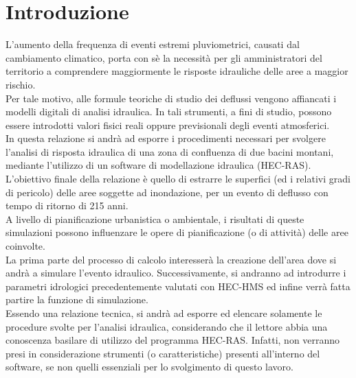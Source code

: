 \section{Introduzione}
L'aumento della frequenza di eventi estremi pluviometrici, causati dal cambiamento climatico, porta con sè la necessità per gli amministratori del territorio a comprendere maggiormente le risposte idrauliche delle aree a maggior rischio.\\
Per tale motivo, alle formule teoriche di studio dei deflussi vengono affiancati i modelli digitali di analisi idraulica. In tali strumenti, a fini di studio, possono essere introdotti valori fisici reali oppure previsionali degli eventi atmosferici.\\ 
In questa relazione si andrà ad esporre i procedimenti necessari per svolgere l'analisi di risposta idraulica di una zona di confluenza di due bacini montani, mediante l'utilizzo di un software di modellazione idraulica (HEC-RAS). L'obiettivo finale della relazione è quello di estrarre le superfici (ed i relativi gradi di pericolo) delle aree soggette ad inondazione, per un evento di deflusso con tempo di ritorno di 215 anni.\\
A livello di pianificazione urbanistica o ambientale, i risultati di queste simulazioni possono influenzare le opere di pianificazione (o di attività) delle aree coinvolte.\\
La prima parte del processo di calcolo interesserà la creazione dell'area dove si andrà a simulare l'evento idraulico. Successivamente, si andranno ad introdurre i parametri idrologici precedentemente valutati con HEC-HMS ed infine verrà fatta partire la funzione di simulazione.\\
Essendo una relazione tecnica, si andrà ad esporre ed elencare solamente le procedure svolte per l'analisi idraulica, considerando che il lettore abbia una conoscenza basilare di utilizzo del programma HEC-RAS. Infatti, non verranno presi in considerazione strumenti (o caratteristiche) presenti all'interno del software, se non quelli essenziali per lo svolgimento di questo lavoro.